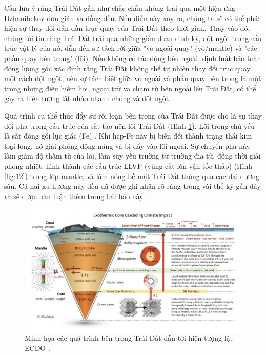 \documentclass[10pt,twocolumn,letterpaper]{article}
\begin{document}
Cần lưu ý rằng Trái Đất gần như chắc chắn không trải qua một hiệu ứng Dzhanibekov đơn giản và đồng đều. Nếu điều này xảy ra, chúng ta sẽ có thể phát hiện sự thay đổi dần dần trục quay của Trái Đất theo thời gian. Thay vào đó, chúng tôi tin rằng Trái Đất trải qua những gián đoạn định kỳ, đột ngột trong cấu trúc vật lý của nó, dẫn đến sự tách rời giữa "vỏ ngoài quay" (vỏ/mantle) và "các phần quay bên trong" (lõi). Nếu không có tác động bên ngoài, định luật bảo toàn động lượng góc xác định rằng Trái Đất không thể tự nhiên thay đổi trục quay một cách đột ngột, nên sự tách biệt giữa vỏ ngoài và phần quay bên trong là một trong những điều hiếm hoi, ngoại trừ va chạm từ bên ngoài lên Trái Đất, có thể gây ra hiện tượng lật nhào nhanh chóng và đột ngột.

Quá trình cụ thể thúc đẩy sự rối loạn bên trong của Trái Đất được cho là sự thay đổi pha trong cấu trúc của sắt tạo nên lõi Trái Đất (Hình \ref{fig:11}). Lõi trong chủ yếu là sắt đóng gói lục giác (Fe) \cite{141}. Khi hcp-Fe này bị biến đổi thành trạng thái kim loại lỏng, nó giải phóng động năng và bị đẩy vào lõi ngoài. Sự chuyển pha này làm giảm độ thấm từ của lõi, làm suy yếu trường từ trường địa từ, đồng thời giải phóng nhiệt, hình thành các cấu trúc LLVP (vùng cắt lớn vận tốc thấp) (Hình \ref{fig:12}) \cite{38} trong lớp mantle, và làm nóng bề mặt Trái Đất thông qua các đại dương sâu. Cả hai xu hướng này đều đã được ghi nhận rõ ràng trong vài thế kỷ gần đây và sẽ được bàn luận thêm trong bài báo này.

\begin{figure}[t]
\begin{center}
\includegraphics[width=1\textwidth]{layers.jpg}
\end{center}
   \caption{Minh họa các quá trình bên trong Trái Đất dẫn tới hiện tượng lật ECDO \cite{129}.}
\label{fig:11}
\end{figure}
\end{document}

